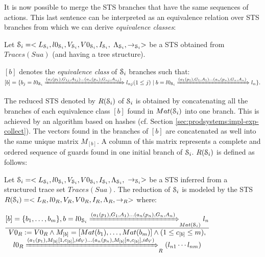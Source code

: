 It is now possible to merge the STS branches that have the same
sequences of actions. This last sentence can be interpreted as an
equivalence relation over STS branches from which we can derive
\emph{equivalence classes}:

\begin{definition}
Let
$\EuScript{S}_i=<L_{\EuScript{S}_i},l0_{\EuScript{S}_i},V_{\EuScript{S}_i},V0_{\EuScript{S}_i},I_{\EuScript{S}_i},$
$\Lambda_{\EuScript{S}_i}, \rightarrow_{\EuScript{S}_i}>$ be a STS obtained from
$Traces(Sua)$ (and having a tree structure).

$[b]$ denotes the \emph{equivalence class} of $\EuScript{S}_i$
branches such that: $[b]=\{
    b_j = l0_{\EuScript{S}_i}\\ \xRightarrow{(a_1(p_1),G_{1j},A_{1j}) \dots
    (a_n(p_n),G_{nj},A_{nj})}
    l_{nj} (1 \leq j) \mid b = l0_{\EuScript{S}_i}
    \xRightarrow{(a_1(p_1),G_{1},A_{1})\dots(a_n(p_n),G_{n},A_{n})} l_n\}.$
\end{definition}

The reduced STS denoted by $R(\EuScript{S}_i)$ of
$\EuScript{S}_i$ is obtained by concatenating all the branches of
each equivalence class $[b]$ found in $Mat(\EuScript{S}_i)$ into
one branch. This is achieved by an algorithm based on hashes (cf.
Section \ref{sec:prodsystems:impl-exp-collect}). The vectors
found in the branches of $[b]$ are concatenated as well into the
same unique matrix $M_{[b]}$. A column of this matrix represents
a complete and ordered sequence of guards found in one initial
branch of $\EuScript{S}_i$. $R(\EuScript{S}_i)$ is defined as
follows:

\begin{definition}
	\label{rule:min}

	Let $\EuScript{S}_i=<L_{\EuScript{S}_i},l0_{\EuScript{S}_i},V_{\EuScript{S}_i},V0_{\EuScript{S}_i},I_{\EuScript{S}_i},\Lambda_{\EuScript{S}_i},$ $\rightarrow_{\EuScript{S}_i}>$ be
    a STS inferred from a structured trace set $Traces(Sua)$. The
    reduction of $\EuScript{S}_i$ is modeled by the STS
    $R(\EuScript{S}_i)=
    <L_R,l0_R,V_R,V0_R,I_R,\Lambda_R,\rightarrow_R>$ where:

  \begin{center}
      {\Large
  $\frac{\begin{matrix}
      [b]=\{b_1, \dots ,b_m\},
      b=l0_{\EuScript{S}_i} \xRightarrow{(a_1(p_1),G_{1},A_{1})
      \dots (a_n(p_n),G_{n},A_{n})}_{Mat(\EuScript{S}_i)} l_{n}\\
    \end{matrix}
  }
  {\begin{matrix}
      V0_R:=V0_R \wedge M_{[b]}=[Mat(b_1), \dots ,Mat(b_m)] \wedge (1 \leq c_{[b]} \leq m),\\
      l0_R \xRightarrow{(a_1(p_1),M_{[b]}[1,c_{[b]}],id_V) \dots
          (a_n(p_n),M_{[b]}[n,c_{[b]}],id_V)}_{R} (l_{n1}
      \cdots l_{nm})
    \end{matrix}
  }$
  }
  \end{center}
\end{definition}

